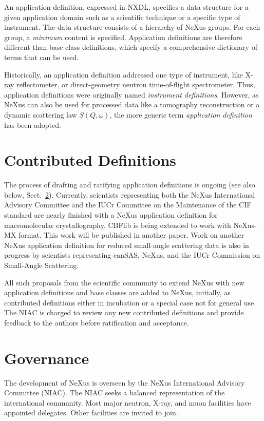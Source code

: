 \documentclass[%
 aip,
rsi,
 amsmath,amssymb,
 reprint,%
]{revtex4-1}
\begin{document}
An application definition, expressed in NXDL, specifies a data structure
for a given application domain such as a scientific technique or a specific type of instrument.
The data structure consists of a hierarchy of NeXus groups.
For each group, a \emph{minimum} content is specified.
Application definitions are therefore different than
base class definitions, which specify a comprehensive 
dictionary of terms that can be used.

Historically, an application definition addressed one type of instrument,
like X-ray reflectometer, or direct-geometry neutron time-of-flight spectrometer.
Thus, application definitions were originally named \emph{instrument definitions}.
However, as NeXus can also be used for processed data
like a tomography reconstruction or a dynamic scattering law $S(Q,\omega)$, 
the more generic term \emph{application definition} has been adopted.


\section{Contributed Definitions}
  \label{sect_contribdef}

The process of drafting and ratifying application definitions
is ongoing (see also below, Sect.~\ref{sect_gov}).
Currently, scientists representing both
the NeXus International Advisory Committee and the IUCr Committee on the Maintenance
of the CIF standard 
are nearly finished with a NeXus application definition for macromolecular crystallography.
CBFlib\cite{cbflib} is being extended to work with NeXus-MX format. This work will be published in another paper. 
Work on another NeXus application definition for reduced small-angle scattering data
is also in progress\cite{cansas}  by scientists representing
canSAS, NeXus, and the IUCr Commission on Small-Angle Scattering.

All such proposals from the scientific community to extend NeXus 
with new application definitions and base classes are added to 
NeXus, initially, as contributed definitions either in incubation 
or a special case not for general use. The NIAC is charged to 
review any new contributed definitions and provide feedback to the 
authors before ratification and acceptance.


\section{Governance}
  \label{sect_gov}

The development of NeXus is overseen
by the NeXus International Advisory Committee (NIAC)\cite{niac}.
The NIAC seeks a balanced representation of the international community.
Most major neutron, X-ray, and muon facilities have appointed delegates.
Other facilities are invited to join.
\end{document}
